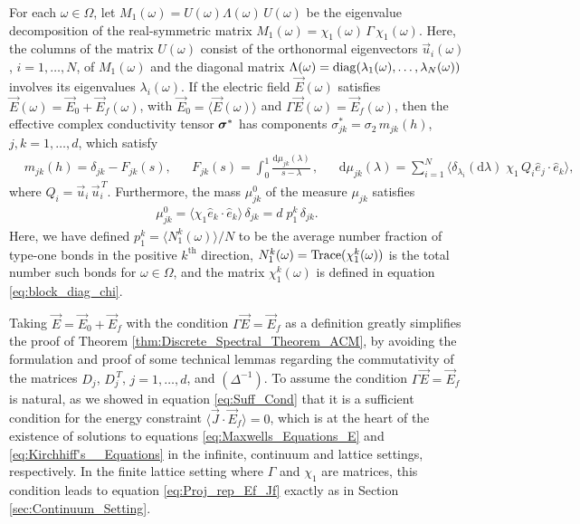 \documentclass{cmslatex}
\renewcommand{\d}{\text{d}}
\newcommand\bsig{\mbox{\boldmath${\sigma}$}}
\begin{document}
\vspace{0.15in}
% 
\begin{theorem}\label{thm:Discrete_Spectral_Theorem_ACM}
  For each $\omega\in\Omega$, let $M_1(\omega)=U(\omega)\Lambda(\omega)\,U(\omega)$ be the eigenvalue
  decomposition of the real-symmetric matrix
  $M_1(\omega)=\chi_1(\omega)\,\Gamma\,\chi_1(\omega)$. Here, the columns of the matrix $U(\omega)$
  consist of the orthonormal eigenvectors $\vec{u}_i(\omega)$, $i=1,\ldots,N$,
  of $M_1(\omega)$ and the diagonal matrix $\Lambda(\omega)={\rm diag}(\lambda_1(\omega),\ldots,\lambda_N(\omega))$
  involves its eigenvalues $\lambda_i(\omega)$. If the electric field
  $\vec{E}(\omega)$ satisfies $\vec{E}(\omega)=\vec{E}_0+\vec{E}_f(\omega)$, with
  $\vec{E}_0=\langle\vec{E}(\omega)\rangle$ and $\Gamma\vec{E}(\omega)=\vec{E}_f(\omega)$, then the
  effective complex conductivity tensor $\bsig^*$ has components
  $\sigma_{jk}^*=\sigma_2\,m_{jk}(h)$, $j,k=1,\ldots,d$,  which satisfy       
%
\begin{align}\label{eq:Stieltjes_F_Discrete}
  &m_{jk}(h)=\delta_{jk}-F_{jk}(s), 
  &&F_{jk}(s)=\int_0^1\frac{\d\mu_{jk}(\lambda)}{s-\lambda}\,, 
  &&\d\mu_{jk}(\lambda)=\sum_{i=1}^N\langle \delta_{\lambda_i}(\d\lambda)\;\chi_1\,Q_i\hat{e}_j\cdot\hat{e}_k\rangle,  
\end{align}
%
where $Q_i=\vec{u}_i\,\vec{u}_i^{\,T}$. Furthermore, the mass $\mu_{jk}^0$ of the
measure $\mu_{jk}$ satisfies 
%
\begin{align}\label{eq:Measure_Mass_theorem}
  \mu_{jk}^0=\langle\chi_1\hat{e}_k\cdot\hat{e}_k\rangle\,\delta_{jk}
       =d\;p_1^k\,\delta_{jk}.
\end{align}
%
Here, we have defined $p_1^k=\langle N_1^k(\omega)\rangle/N$ to be the average number
fraction of type-one bonds in the positive $k^{\text{th}}$ direction,
$N_1^k(\omega)={\rm Trace}(\chi_1^k(\omega))$ is the total number such bonds for
$\omega\in\Omega$, and the matrix $\chi_1^k(\omega)$ is defined in equation
\eqref{eq:block_diag_chi}.  
% 
\end{theorem}


Taking $\vec{E}=\vec{E}_0+\vec{E}_f$ with the 
condition $\Gamma\vec{E}=\vec{E}_f$ as a definition greatly simplifies the
proof of Theorem \ref{thm:Discrete_Spectral_Theorem_ACM}, by avoiding
the formulation and proof of some technical lemmas regarding the
commutativity of the matrices $D_j$, $D_j^{\,T}$, $j=1,\ldots,d$, and
$(\Delta^{-1})$. To assume the condition $\Gamma\vec{E}=\vec{E}_f$ is natural, 
as we showed in equation \eqref{eq:Suff_Cond} that it is a 
sufficient condition for the energy constraint
$\langle\vec{J}\cdot\vec{E}_f\rangle=0$, which is at the heart of the existence of
solutions to equations \eqref{eq:Maxwells_Equations_E} and
\eqref{eq:Kirchhiff's__Equations} in the infinite, continuum and
lattice settings, respectively. In the finite lattice setting where
$\Gamma$ and $\chi_1$ are matrices, this condition leads to equation
\eqref{eq:Proj_rep_Ef_Jf} exactly as in Section
\ref{sec:Continuum_Setting}.  
\end{document}
